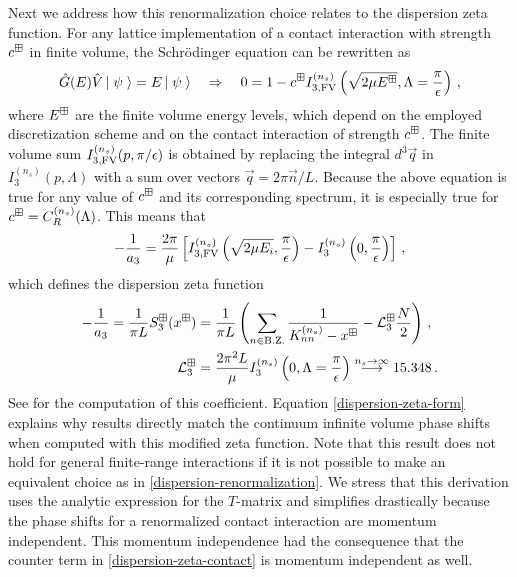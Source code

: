 Next we address how this renormalization choice relates to the dispersion zeta function.
For any lattice implementation of a contact interaction with strength $c^\boxplus$ in finite volume, the Schr\"odinger equation can be rewritten as
\begin{equation}\label{eq:schroe}
	\hat G(E) \hat V \left|\;\psi\;\right\rangle = E\left|\;\psi\;\right\rangle
	\quad \Rightarrow \quad
	0 = 1 - c^\boxplus I_{3, \textrm{FV}}^{(n_s)}\left(\sqrt{2 \mu E^\boxplus}, \Lambda = \frac{\pi}{\epsilon}\right) \, ,
\end{equation}
where $E^\boxplus$ are the finite volume energy levels, which depend on the employed discretization scheme and on the contact interaction of strength $c^\boxplus$.
The finite volume sum $I_{3, \textrm{FV}}^{(n_s)}(p, \pi/\epsilon)$ is obtained by replacing the integral $d^3 \vec q$ in $I_3^{(n_s)}(p, \Lambda)$ with a sum  over vectors $\vec q = 2 \pi \vec n / L$.
Because the above equation is true for any value of $c^\boxplus$ and its corresponding spectrum, it is especially true for $c^\boxplus = C_R^{(n_s)}(\Lambda)$.
This means that
\begin{equation}
	- \frac{1}{a_3}
	=
	\frac{2 \pi}{\mu}
		\left[
		I_{3, \textrm{FV}}^{(n_s)}\left(\sqrt{2 \mu E_i}, \frac{\pi}{\epsilon}\right)
		- I_3^{(n_s)}\left(0, \frac{\pi}{\epsilon}\right)
		\right]
	\, ,
\end{equation}
which defines the dispersion zeta function
\begin{align}\label{eq:dispersion-zeta-form}
	- \frac{1}{a_3}
	=
	\frac{1}{\pi L}
	S^{\boxplus}_3(x^\boxplus)
	&=\frac{1}{\pi L}\left(\sum\limits_{n \in \text{B.Z.}}\frac{1}{K_{nn}^{(n_s)} - x^\boxplus} - \mathcal{L}_3^{\boxplus} \frac{N}{2}\right)
	\, ,
	\\ \label{eq:dispersion-zeta-contact}
	\mathcal{L}_3^\boxplus
	&=
	\frac{2 \pi^2 L}{\mu}
	I_3^{(n_s)}\left(0, \Lambda = \frac{\pi}{\epsilon}\right)
	\overset{n_s\to\infty}{\longrightarrow} 15.348
	\, .
\end{align}
See  for the computation of this coefficient.
Equation \eqref{dispersion-zeta-form} explains why results directly match the continuum infinite volume phase shifts when computed with this modified zeta function.
Note that this result does not hold for general finite-range interactions if it is not possible to make an equivalent choice as in \eqref{dispersion-renormalization}.
We stress that this derivation uses the analytic  expression for the $T$-matrix and simplifies drastically because the phase shifts for a renormalized contact interaction are momentum independent.
This momentum independence had the consequence that the counter term in \eqref{dispersion-zeta-contact} is momentum independent as well.

